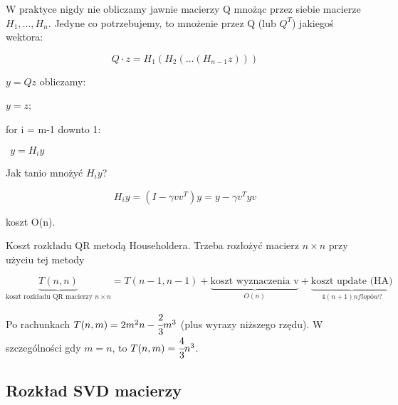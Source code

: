 \documentclass[hidelinks,a4paper,fleqn]{article}
\newcommand{\RR}{\mathbb{R}}
\newcommand{\ra}{\rightarrow}
\newcommand{\norm}[1]{\left\lVert#1\right\rVert}
\begin{document}
W praktyce nigdy nie obliczamy jawnie macierzy Q mnożąc przez siebie macierze $H_1, ..., H_n$. Jedyne co potrzebujemy, to mnożenie przez Q (lub $Q^T$) jakiegoś wektora:

\[
	Q \cdot z = H_1(H_2(...(H_{n-1}z)))
\]

$y = Qz$ obliczamy:

$y=z$;

for i = m-1 downto 1:

$\ \ y = H_iy$

Jak tanio mnożyć $H_i y$?

\[
	H_i y = (I - \gamma vv^T)y = y - \gamma v^Tyv
\]

koszt O(n).

Koszt rozkładu QR metodą Householdera. Trzeba rozłożyć macierz $n \times n$ przy użyciu tej metody

\[
	\underbrace{T(n, n)}_{\textrm{koszt rozkładu QR macierzy }n \times n} = T(n-1, n-1) + \underbrace{\textrm{koszt wyznaczenia v}}_{O(n)} + \underbrace{\textrm{koszt update (HA)}}_{4(n+1)n flopów?}
\]

Po rachunkach $T(n, m) = 2m^2n - \cfrac{2}{3}m^3$ (plus wyrazy niższego rzędu). W szczególności gdy $m = n$, to $T(n, m) = \cfrac{4}{3} n^3$.

\subsection{Rozkład SVD macierzy}
%
%


\end{document}
